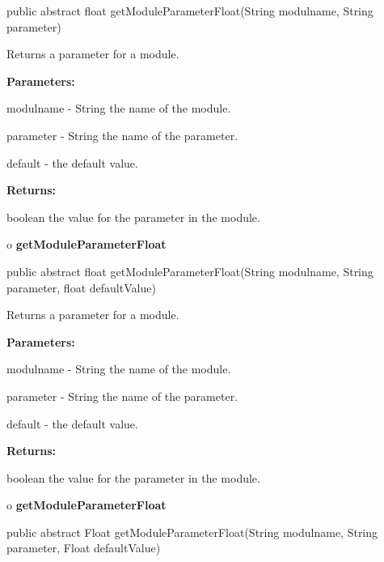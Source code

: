 \begin{PRE}
 public abstract float getModuleParameterFloat(String modulname,
                                               String parameter)
\end{PRE}

\begin{description}
\htmlDD Returns a parameter for a module. 

\begin{description}
\item {\bf Parameters:}  

modulname - String the name of the module.  

parameter - String the name of the parameter.  

default - the default value.  
\item {\bf Returns:}  

boolean the value for the parameter in the module.  
\end{description}

\end{description}

o {\bf getModuleParameterFloat} 

\begin{PRE}
 public abstract float getModuleParameterFloat(String modulname,
                                               String parameter,
                                               float defaultValue)
\end{PRE}

\begin{description}
\htmlDD Returns a parameter for a module. 

\begin{description}
\item {\bf Parameters:}  

modulname - String the name of the module.  

parameter - String the name of the parameter.  

default - the default value.  
\item {\bf Returns:}  

boolean the value for the parameter in the module.  
\end{description}

\end{description}

o {\bf getModuleParameterFloat} 

\begin{PRE}
 public abstract Float getModuleParameterFloat(String modulname,
                                               String parameter,
                                               Float defaultValue)
\end{PRE}

